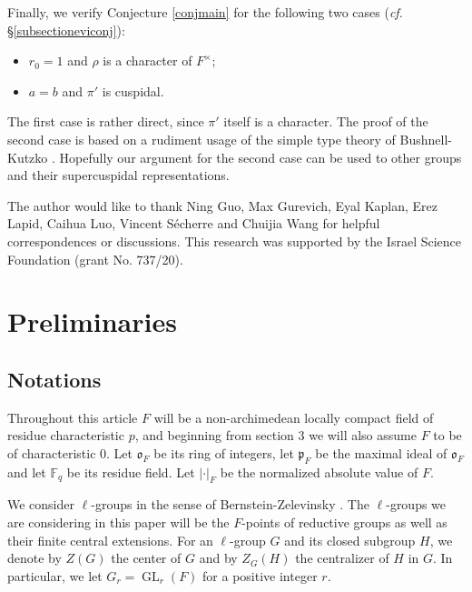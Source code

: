 \documentclass{amsart}
\numberwithin{equation}{section}
\newcommand{\abs}[1]{\left|#1\right|_{F}}
\newcommand{\mrgl}{\operatorname{GL}}
\newcommand{\mbf}{\mathbb{F}}
\newcommand{\mfp}{\mathfrak{p}}
\newcommand{\mfo}{\mathfrak{o}}
\begin{document}
	Finally, we verify Conjecture \ref{conjmain} for the following two cases (\emph{cf.} \S \ref{subsectioneviconj}):
	\begin{itemize}
		\item $r_{0}=1$	and $\rho$ is a character of $F^{\times}$;
		\item $a=b$ and $\pi'$ is cuspidal.
	\end{itemize}
	The first case is rather direct, since $\pi'$ itself is a character. The proof of the second case is based on a rudiment usage of the simple type theory of Bushnell-Kutzko \cite{bushnell129admissible}. Hopefully our argument for the second case can be used to other groups and their supercuspidal representations.
	
	The author would like to thank Ning Guo, Max Gurevich, Eyal Kaplan, Erez Lapid, Caihua Luo, Vincent S\'echerre and Chuijia Wang for helpful correspondences or discussions. This research was supported by the Israel Science Foundation (grant No. 737/20).
	
	\section{Preliminaries}
	
	\subsection{Notations}\label{subsectionnotation}
	
	Throughout this article $F$ will be a non-archimedean locally compact field of residue characteristic $p$, and beginning from section 3 we will also assume $F$ to be of characteristic $0$. Let $\mfo_{F}$ be its ring of integers, let $\mfp_{F}$ be the maximal ideal of $\mfo_{F}$ and let $\mbf_{q}$ be its residue field. Let $\abs{\cdot}$ be the normalized absolute value of $F$. 
	
	We consider $\ell$-groups in the sense of Bernstein-Zelevinsky \cite{bernstein1976representations}. The $\ell$-groups we are considering in this paper will be the $F$-points of reductive groups as well as their finite central extensions. For an $\ell$-group $G$ and its closed subgroup $H$, we denote by $Z(G)$ the center of $G$ and by $Z_{G}(H)$ the centralizer of $H$ in $G$. In particular, we let $G_{r}=\mrgl_{r}(F)$ for a positive integer $r$. 
	
\end{document}
